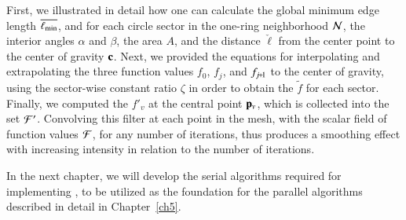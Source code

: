 First, we illustrated in detail how one can calculate the global minimum edge length $\overline{\ell_\text{min}}$, and for each circle sector in the one-ring neighborhood $\mathcal{N}$, the interior angles $\alpha$ and $\beta$, the area $A$, and the distance $\check{\ell}$ from the center point to the center of gravity $\mathbf{c}$. Next, we provided the equations for interpolating and extrapolating the three function values $f_0$, $f_j$, and $f_{\sjpo}$ to the center of gravity, using the sector-wise constant ratio $\zeta$ in order to obtain the \wmfv{} $\tilde{f}$ for each sector. Finally, we computed the \wmfv{} $f'_v$ at the central point $\mathbf{p}_v$, which is collected into the set $\mathcal{F}'$. Convolving this filter at each point in the mesh, with the scalar field of function values $\mathcal{F}$, for any number of iterations, thus produces a smoothing effect with increasing intensity in relation to the number of iterations.

In the next chapter, we will develop the serial algorithms required for implementing , to be utilized as the foundation for the parallel algorithms described in detail in Chapter~\ref{ch5}.

